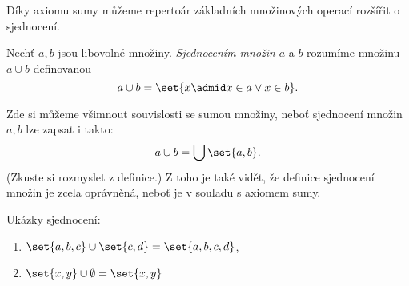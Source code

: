 Díky axiomu sumy můžeme repertoár základních množinových operací rozšířit o sjednocení.
\begin{definition}\label{def:sjednoceni}
    Nechť $a,b$ jsou libovolné množiny. \emph{Sjednocením množin} $a$ a $b$ rozumíme množinu $a\cup b$ definovanou
    \begin{equation*}
        a\cup b=\set{x \admid x\in a \lor x\in b}.
    \end{equation*}
\end{definition}
Zde si můžeme všimnout souvislosti se sumou množiny, neboť sjednocení množin $a,b$ lze zapsat i takto:
\begin{equation*}
    a\cup b=\bigcup\set{a,b}.
\end{equation*}
(Zkuste si rozmyslet z definice.) Z toho je také vidět, že definice sjednocení množin je zcela oprávněná, neboť je v souladu s axiomem sumy.
\begin{example}
    Ukázky sjednocení:
    \begin{enumerate}[label=(\roman*)]
        \item $\set{a,b,c}\cup\set{c,d}=\set{a,b,c,d}$,
        \item $\set{x,y}\cup\emptyset=\set{x,y}$
    \end{enumerate}
\end{example}

